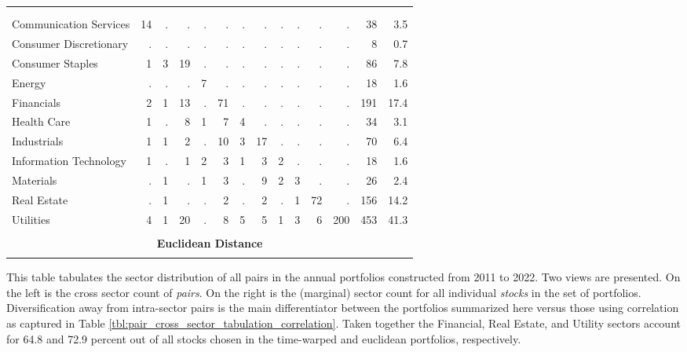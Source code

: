 \begin{table}[hp]
\begin{threeparttable}
\begin{tabular}{l r r r r r r r r r r r | r r}
          \vspace{1 mm} \\
                                   &    &    &    &    &    &    &    &    &    &    &    \\
          Communication Services   & 14 &  . &  . &  . &  . &  . &  . &  . &  . &  . &   . &  38 &  3.5 \\
          Consumer Discretionary   &  . &  . &  . &  . &  . &  . &  . &  . &  . &  . &   . &   8 &  0.7 \\
          Consumer Staples         &  1 &  3 & 19 &  . &  . &  . &  . &  . &  . &  . &   . &  86 &  7.8 \\
          Energy                   &  . &  . &  . &  7 &  . &  . &  . &  . &  . &  . &   . &  18 &  1.6 \\
          Financials               &  2 &  1 & 13 &  . & 71 &  . &  . &  . &  . &  . &   . & 191 & 17.4 \\
          Health Care              &  1 &  . &  8 &  1 &  7 &  4 &  . &  . &  . &  . &   . &  34 &  3.1 \\
          Industrials              &  1 &  1 &  2 &  . & 10 &  3 & 17 &  . &  . &  . &   . &  70 &  6.4 \\
          Information Technology   &  1 &  . &  1 &  2 &  3 &  1 &  3 &  2 &  . &  . &   . &  18 &  1.6 \\
          Materials                &  . &  1 &  . &  1 &  3 &  . &  9 &  2 &  3 &  . &   . &  26 &  2.4 \\
          Real Estate              &  . &  1 &  . &  . &  2 &  . &  2 &  . &  1 & 72 &   . & 156 & 14.2 \\
          Utilities                &  4 &  1 & 20 &  . &  8 &  5 &  5 &  1 &  3 &  6 & 200 & 453 & 41.3 \\
          \vspace{0.25 mm} \\
          \multicolumn{14}{c}{\textbf{Euclidean Distance}} \\
          \vspace{1 mm} \\
          \hline
      \end{tabular}
      \begin{tablenotes}
          \item{\footnotesize This table tabulates the sector distribution of all pairs in the annual portfolios constructed from 2011 to 2022. Two views are presented. On the left is the cross sector count of \textit{pairs}. On the right is the (marginal) sector count for all individual \textit{stocks} in the set of portfolios. Diversification away from intra-sector pairs is the main differentiator between the portfolios summarized here versus those using correlation as captured in Table \ref{tbl:pair_cross_sector_tabulation_correlation}. Taken together the Financial, Real Estate, and Utility sectors account for 64.8 and 72.9 percent out of all stocks chosen in the time-warped and euclidean portfolios, respectively.}
      \end{tablenotes}
    \end{threeparttable}
\end{table}

